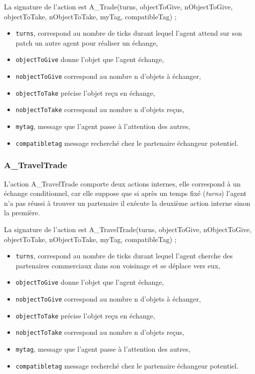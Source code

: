 	La signature de l'action est A\_Trade(turns, objectToGive, nObjectToGive, objectToTake, nObjectToTake, myTag, compatibleTag) ;
	
		\begin{itemize}
	\item \texttt{turns}, correspond au nombre de ticks durant lequel l'agent attend sur son patch un autre agent pour réaliser un échange,
	\item \texttt{objectToGive}  donne l'objet que l'agent échange,
	\item\texttt{nobjectToGive} correspond au nombre n d'objets à échanger,
	\item \texttt{objectToTake}  précise l'objet reçu en échange,
	\item \texttt{nobjectToTake} correspond au nombre n d'objets reçus,
	\item \texttt{mytag}, message que l'agent passe à l'attention des autres,
	\item \texttt{compatibletag} message recherché chez le partenaire échangeur potentiel.
	\end{itemize}
	
	\subsubsection{A\_TravelTrade} 
	
	L'action A\_TravelTrade  comporte deux actions internes, elle correspond à un échange conditionnel,  car elle suppose que si après un temps fixé (\textit{turns}) l'agent n'a pas réussi à trouver un partenaire il exécute la deuxième action interne sinon la première.

	La signature de l'action est A\_TravelTrade(turns, objectToGive, nObjectToGive, objectToTake, nObjectToTake, myTag, compatibleTag) ;
	
		\begin{itemize}
	\item \texttt{turns}, correspond au nombre de ticks durant lequel l'agent cherche des partenaires commerciaux dans son voisinage et se déplace vers eux,
	\item \texttt{objectToGive}  donne l'objet que l'agent échange,
	\item\texttt{nobjectToGive} correspond au nombre n d'objets à échanger,
	\item \texttt{objectToTake}  précise l'objet reçu en échange,
	\item \texttt{nobjectToTake} correspond au nombre n d'objets reçus,
	\item \texttt{mytag}, message que l'agent passe à l'attention des autres,
	\item \texttt{compatibletag} message recherché chez le partenaire échangeur potentiel.
	\end{itemize}
	
